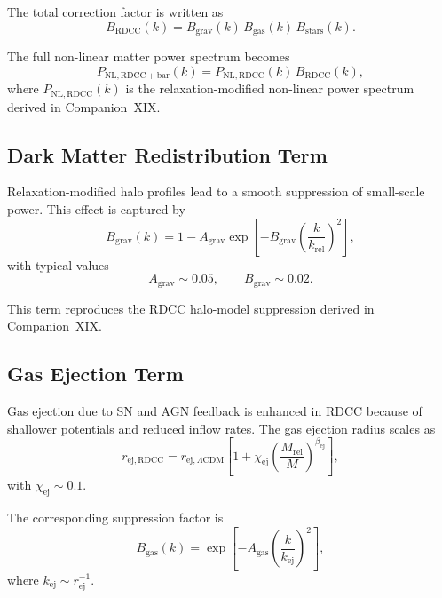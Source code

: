 \documentclass[11pt,a4paper]{article}
\begin{document}
The total correction factor is written as
\begin{equation}
B_{\mathrm{RDCC}}(k)
=
B_{\mathrm{grav}}(k)\,
B_{\mathrm{gas}}(k)\,
B_{\mathrm{stars}}(k).
\end{equation}

The full non-linear matter power spectrum becomes
\begin{equation}
P_{\mathrm{NL,RDCC+bar}}(k)
=
P_{\mathrm{NL,RDCC}}(k)\,
B_{\mathrm{RDCC}}(k),
\end{equation}
where $P_{\mathrm{NL,RDCC}}(k)$ is the relaxation-modified non-linear power spectrum
derived in Companion~XIX.

\subsection{Dark Matter Redistribution Term}

Relaxation-modified halo profiles lead to a smooth suppression of small-scale power. This
effect is captured by
\begin{equation}
B_{\mathrm{grav}}(k)
=
1
-
A_{\mathrm{grav}}
\exp\!\left[
-
B_{\mathrm{grav}}
\left(
\frac{k}{k_{\mathrm{rel}}}
\right)^{2}
\right],
\end{equation}
with typical values
\begin{equation}
A_{\mathrm{grav}} \sim 0.05,
\qquad
B_{\mathrm{grav}} \sim 0.02.
\end{equation}

This term reproduces the RDCC halo-model suppression derived in Companion~XIX.

\subsection{Gas Ejection Term}

Gas ejection due to SN and AGN feedback is enhanced in RDCC because of shallower
potentials and reduced inflow rates. The gas ejection radius scales as
\begin{equation}
r_{\mathrm{ej,RDCC}}
=
r_{\mathrm{ej},\Lambda\mathrm{CDM}}
\left[
1
+
\chi_{\mathrm{ej}}
\left(
\frac{M_{\mathrm{rel}}}{M}
\right)^{\beta_{\mathrm{ej}}}
\right],
\end{equation}
with $\chi_{\mathrm{ej}} \sim 0.1$.

The corresponding suppression factor is
\begin{equation}
B_{\mathrm{gas}}(k)
=
\exp\!\left[
-
A_{\mathrm{gas}}
\left(
\frac{k}{k_{\mathrm{ej}}}
\right)^{2}
\right],
\end{equation}
where $k_{\mathrm{ej}} \sim r_{\mathrm{ej}}^{-1}$.
\end{document}
